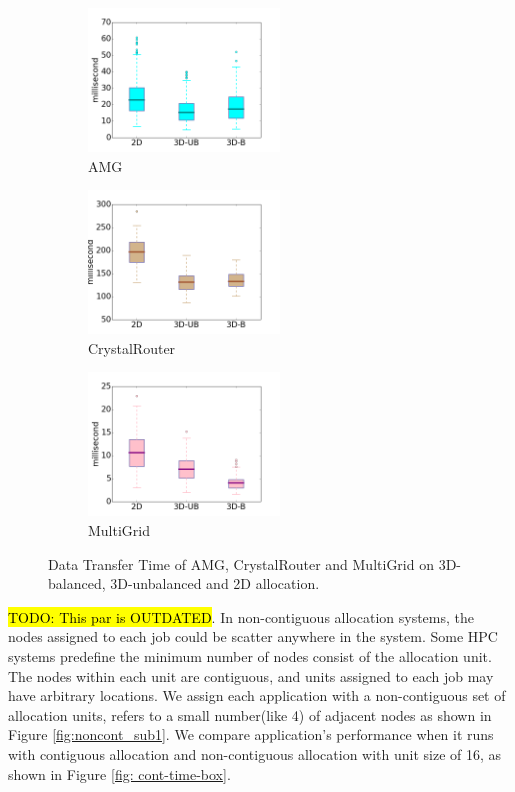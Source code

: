 \documentclass[conference]{IEEEtran}
\newcommand{\TODO}[1]{\hl{TODO: #1}}
\begin{document}
\begin{figure}[t!]
    \centering
    \begin{subfigure}[t]{0.32\textwidth}
        \centering
        \includegraphics[height=1.5in]{figs/intra-job/shapestudy/amg_box}
        \caption{AMG}
        \label{fig:shapstudy-amg}
    \end{subfigure}%
    \hspace{1em}%
    \begin{subfigure}[t]{0.32\textwidth}
        \centering
        \includegraphics[height=1.5in]{figs/intra-job/shapestudy/cr_box}
        \caption{CrystalRouter}
        \label{fig:shapstudy-cr}
    \end{subfigure}%
    \begin{subfigure}[t]{0.32\textwidth}
        \centering
        \includegraphics[height=1.5in]{figs/intra-job/shapestudy/mg_box}
        \caption{MultiGrid}
        \label{fig:shapstudy-mg}
    \end{subfigure}%
   \caption{Data Transfer Time of AMG, CrystalRouter and MultiGrid on 3D-balanced, 3D-unbalanced and 2D allocation.}
   \label{fig:shapestudy}
\end{figure}


\TODO{This par is OUTDATED}. In non-contiguous allocation systems, the nodes assigned to each job could be scatter anywhere in the system. Some HPC systems predefine the minimum number of nodes consist of the allocation unit. The nodes within each unit are contiguous, and units assigned to each job may have arbitrary locations. We assign each application with a non-contiguous set of allocation units, refers to a small number(like 4) of adjacent nodes as shown in Figure \ref{fig:noncont_sub1}. We compare application's performance when it runs with contiguous allocation and non-contiguous allocation with unit size of 16, as shown in Figure \ref{fig: cont-time-box}. 
\end{document}
